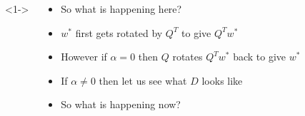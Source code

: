 \begin{frame}
\begin{columns}
		<1->
		\vspace{3em}
		\begin{overlayarea}{\textwidth}{\textheight}
			\begin{itemize}
				\item <1-> So what is happening here?
				\item <2->  $w^*$ first gets rotated by $Q^T$ to give $Q^Tw^*$
				\item <3->  However if $\alpha = 0$ then $Q$ rotates $Q^Tw^*$ back to give $w^*$
				\item <4->  If $\alpha \neq 0$ then let us see what $D$ looks like
				\item <16->  So what is happening now?
			\end{itemize}
		\end{overlayarea}
	\end{columns}
\end{frame}
	
